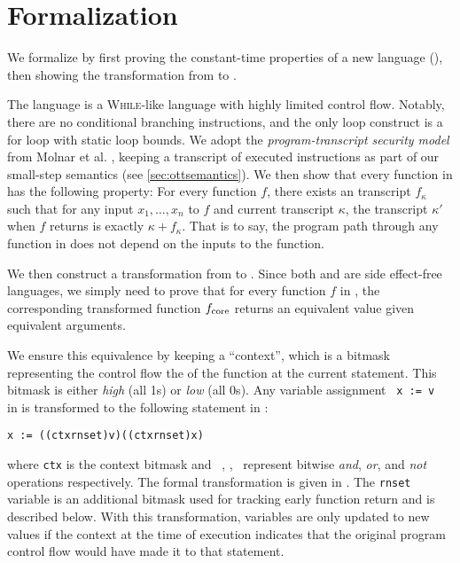 \section{Formalization}
\label{sec:formalization}

We formalize \constc by first proving the constant-time properties of a new
language (\ccore), then showing the transformation from \constc to \ccore.

The language \ccore is a \textsc{While}-like language with highly limited
control flow. Notably, there are no conditional branching instructions, and the
only loop construct is a for loop with static loop bounds. We adopt the
\emph{program-transcript security model} from Molnar et al. \cite{molnar2005},
keeping a transcript of executed instructions as part of our small-step
semantics (see \autoref{sec:ottsemantics}). We then show that every function in
\ccore has the following property: For every function $f$, there exists an
transcript $f_\kappa$ such that for any input $x_1,\dots,x_n$ to $f$ and
current transcript $\kappa$, the transcript $\kappa'$ when $f$ returns is
exactly $\kappa + f_\kappa$. That is to say, the program path through any
function in \ccore does not depend on the inputs to the function.

We then construct a transformation from \constc to \ccore. Since both \ccore
and \constc are side effect-free languages, we simply need to prove that for
every function $f$ in \constc, the corresponding transformed function
$f_{\textnormal{core}}$ returns an equivalent value given equivalent arguments.

We ensure this equivalence by keeping a ``context'', which is a bitmask
representing the control flow the of the function at the current statement.
This bitmask is either \emph{high} (all 1s) or \emph{low} (all 0s).  Any variable assignment
~\texttt{x := v}~ in \constc is transformed to the following statement in
\ccore:
\begin{center}
  \texttt{x := ((ctx\bandx rnset)\bandx v)\borx(\bnot (ctx\bandx rnset)\bandx x)}
\end{center}
where \texttt{ctx} is the context bitmask and ~\band, \bor, \bnot\ represent
bitwise \emph{and}, \emph{or}, and \emph{not} operations respectively. The
formal transformation is given in . The \texttt{rnset}
variable is an additional bitmask used for tracking early function return and
is described below.  With this transformation, variables are only updated to
new values if the context at the time of execution indicates that the original
program control flow would have made it to that statement.


